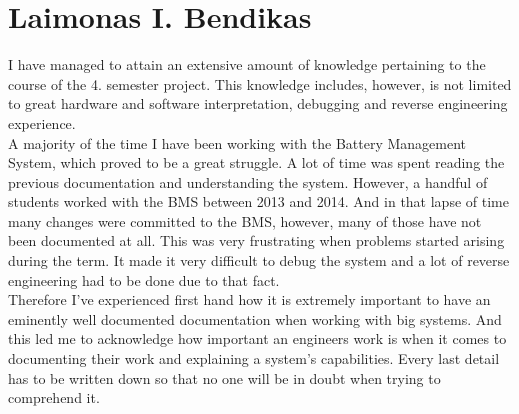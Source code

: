 \section{Laimonas I. Bendikas}
I have managed to attain an extensive amount of knowledge pertaining to the course of the 4. semester project. This knowledge includes, however, is not limited to great hardware and software interpretation, debugging and reverse engineering experience.\\
A majority of the time I have been working with the Battery Management System, which proved to be a great struggle. A lot of time was spent reading the previous documentation and understanding the system. However, a handful of students worked with the BMS between 2013 and 2014. And in that lapse of time many changes were committed to the BMS, however, many of those have not been documented at all. This was very frustrating when problems started arising during the term. It made it very difficult to debug the system and a lot of reverse engineering had to be done due to that fact.\\
Therefore I've experienced first hand how it is extremely important to have an eminently well documented documentation when working with big systems. And this led me to acknowledge how important an engineers work is when it comes to documenting their work and explaining a system's capabilities. Every last detail has to be written down so that no one will be in doubt when trying to comprehend it. 